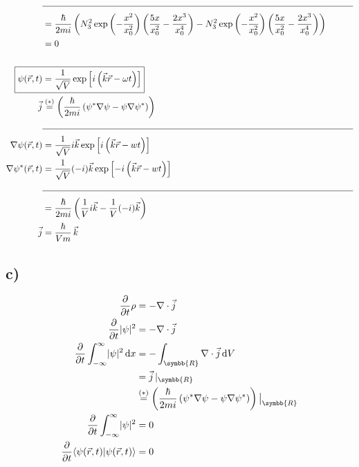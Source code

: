 \begin{align*}
        &\text{\noindent\makebox[\linewidth]{\rule{\linewidth}{0.4pt}}}\\
        &= \frac{\hbar}{2mi} \left( N_3^2 \exp \left( -\frac{x^2}{x_0^2} \right) \left( \frac{5x}{x_0^2} - \frac{2x^3}{x_0^4} \right) - N_3^2 \exp \left( -\frac{x^2}{x_0^2} \right) \left( \frac{5x}{x_0^2} - \frac{2x^3}{x_0^4} \right) \right)\\
        &= 0\\
        \\
        \Aboxed{\psi(\vec{r}, t) &= \frac{1}{\sqrt{V}} \exp \left[ i \left( \vec{k} \vec{r} - \omega t \right) \right]}\\
        \vec{j} &\stackrel{(*)}{=} \left( \frac{\hbar}{2mi} \left( \psi^* \nabla \psi - \psi \nabla \psi^* \right) \right)\\
        &\text{\noindent\makebox[\linewidth]{\rule{\linewidth}{0.4pt}}}\\
        \nabla \psi(\vec{r}, t) &= \frac{1}{\sqrt{V}} i\vec{k} \exp \left[ i \left( \vec{k} \vec{r} - wt \right) \right]\\
        \nabla \psi^*(\vec{r}, t) &= \frac{1}{\sqrt{V}} (-i)\vec{k} \exp \left[ -i \left( \vec{k} \vec{r} - wt \right) \right]\\
        &\text{\noindent\makebox[\linewidth]{\rule{\linewidth}{0.4pt}}}\\
        &= \frac{\hbar}{2mi} \left( \frac{1}{V} i\vec{k} - \frac{1}{V} (-i)\vec{k} \right)\\
        \vec{j} &= \frac{\hbar}{Vm}\, \vec{k}
    \end{align*}

\newpage
\subsection{c)}

    \begin{align*}
        \frac{\partial}{\partial t} \rho &= -\nabla \cdot \vec{j}\\
        \frac{\partial}{\partial t} \abs{\psi}^2 &= - \nabla \cdot \vec{j}\\
        \frac{\partial}{\partial t} \int_{-\infty}^{\infty}  \abs{\psi}^2 \,\mathrm{d}x &= -\int_{\symbb{R}} \nabla \cdot \vec{j} \,\mathrm{d}V\\
        &= \vec{j}\, \vert_{\symbb{R}}\\
        &\stackrel{(*)}{=} \left( \frac{\hbar}{2mi} \left( \psi^* \nabla \psi - \psi \nabla \psi^*   \right) \right) \big| _{\symbb{R}}\\
        \frac{\partial}{\partial t} \int_{-\infty}^{\infty} \abs{\psi}^2 &= 0\\
        \frac{\partial}{\partial t} \langle \psi(\vec{r}, t) \vert \psi(\vec{r}, t) \rangle &= 0
    \end{align*}

